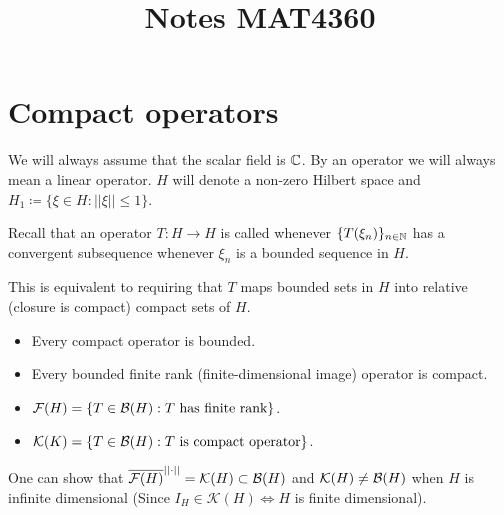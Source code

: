 \documentclass[10pt,english,a4paper]{article}
\title{Notes MAT4360}
\theoremstyle{definition}
\let\emph\relax %
\def\Ff{\mathcal{F}}
\def\Kf{\mathcal{K}}
\begin{document}
\maketitle

\section{Compact operators}
We will always assume that the scalar field is $\mathbb{C}$. By an operator we will always 
mean a linear operator. $H$ will denote a non-zero Hilbert space and 
$H_1 \coloneqq \{ \xi \in H : ||\xi||\leq 1 \}$.

Recall that an operator $T \colon H \to H$ is called \emph{compact} whenever 
$\{T(\xi_n)\}_{n \in \mathbb{N}}$ has a convergent subsequence whenever $\xi_n$ is 
a bounded sequence in $H$.

This is equivalent to requiring that $T$ maps bounded sets in $H$ into relative
(closure is compact) compact sets of $H$.

\begin{itemize}
    \item Every compact operator is bounded. 
    \item Every bounded finite rank (finite-dimensional image) operator is compact.
    \item $\Ff(H) = \{ T \in \Bs(H): T \text{ has finite rank} \}$. 
    \item $\Kf(K) = \{T \in \Bs(H) : T \text{ is compact operator}\}$.
\end{itemize}
One can show that $\ol{\Ff(H)}^{||\cdot||} = \Kf(H) \subset \Bs(H)$ 
and $\Kf(H) \neq \Bs(H)$ when $H$ is infinite dimensional (Since $I_{H} \in
\Kf(H) \iff H$ is finite dimensional). 
\end{document}
